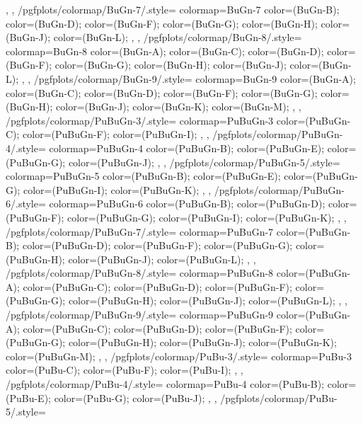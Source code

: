 {{{    },
  },
  /pgfplots/colormap/BuGn-7/.style={
    colormap={BuGn-7}{
      color=(BuGn-B);
      color=(BuGn-D);
      color=(BuGn-F);
      color=(BuGn-G);
      color=(BuGn-H);
      color=(BuGn-J);
      color=(BuGn-L);
    },
  },
  /pgfplots/colormap/BuGn-8/.style={
    colormap={BuGn-8}{
      color=(BuGn-A);
      color=(BuGn-C);
      color=(BuGn-D);
      color=(BuGn-F);
      color=(BuGn-G);
      color=(BuGn-H);
      color=(BuGn-J);
      color=(BuGn-L);
    },
  },
  /pgfplots/colormap/BuGn-9/.style={
    colormap={BuGn-9}{
      color=(BuGn-A);
      color=(BuGn-C);
      color=(BuGn-D);
      color=(BuGn-F);
      color=(BuGn-G);
      color=(BuGn-H);
      color=(BuGn-J);
      color=(BuGn-K);
      color=(BuGn-M);
    },
  },
  /pgfplots/colormap/PuBuGn-3/.style={
    colormap={PuBuGn-3}{
      color=(PuBuGn-C);
      color=(PuBuGn-F);
      color=(PuBuGn-I);
    },
  },
  /pgfplots/colormap/PuBuGn-4/.style={
    colormap={PuBuGn-4}{
      color=(PuBuGn-B);
      color=(PuBuGn-E);
      color=(PuBuGn-G);
      color=(PuBuGn-J);
    },
  },
  /pgfplots/colormap/PuBuGn-5/.style={
    colormap={PuBuGn-5}{
      color=(PuBuGn-B);
      color=(PuBuGn-E);
      color=(PuBuGn-G);
      color=(PuBuGn-I);
      color=(PuBuGn-K);
    },
  },
  /pgfplots/colormap/PuBuGn-6/.style={
    colormap={PuBuGn-6}{
      color=(PuBuGn-B);
      color=(PuBuGn-D);
      color=(PuBuGn-F);
      color=(PuBuGn-G);
      color=(PuBuGn-I);
      color=(PuBuGn-K);
    },
  },
  /pgfplots/colormap/PuBuGn-7/.style={
    colormap={PuBuGn-7}{
      color=(PuBuGn-B);
      color=(PuBuGn-D);
      color=(PuBuGn-F);
      color=(PuBuGn-G);
      color=(PuBuGn-H);
      color=(PuBuGn-J);
      color=(PuBuGn-L);
    },
  },
  /pgfplots/colormap/PuBuGn-8/.style={
    colormap={PuBuGn-8}{
      color=(PuBuGn-A);
      color=(PuBuGn-C);
      color=(PuBuGn-D);
      color=(PuBuGn-F);
      color=(PuBuGn-G);
      color=(PuBuGn-H);
      color=(PuBuGn-J);
      color=(PuBuGn-L);
    },
  },
  /pgfplots/colormap/PuBuGn-9/.style={
    colormap={PuBuGn-9}{
      color=(PuBuGn-A);
      color=(PuBuGn-C);
      color=(PuBuGn-D);
      color=(PuBuGn-F);
      color=(PuBuGn-G);
      color=(PuBuGn-H);
      color=(PuBuGn-J);
      color=(PuBuGn-K);
      color=(PuBuGn-M);
    },
  },
  /pgfplots/colormap/PuBu-3/.style={
    colormap={PuBu-3}{
      color=(PuBu-C);
      color=(PuBu-F);
      color=(PuBu-I);
    },
  },
  /pgfplots/colormap/PuBu-4/.style={
    colormap={PuBu-4}{
      color=(PuBu-B);
      color=(PuBu-E);
      color=(PuBu-G);
      color=(PuBu-J);
    },
  },
  /pgfplots/colormap/PuBu-5/.style={
}}
